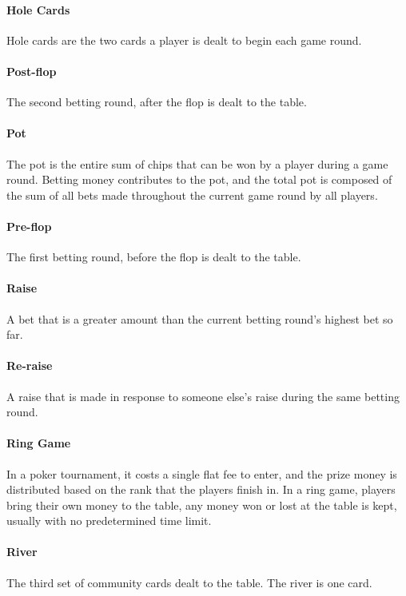 \begin{flushleft}
\paragraph*{Hole Cards} Hole cards are the two cards a player is dealt to begin each game round.
 
\paragraph*{Post-flop} The second betting round, after the flop is dealt to the table.

\paragraph*{Pot} The pot is the entire sum of chips that can be won by a player during a game round. Betting money contributes to the pot, and the total pot is composed of the sum of all bets made throughout the current game round by all players.
 
\paragraph*{Pre-flop} The first betting round, before the flop is dealt to the table.
 
\paragraph*{Raise} A bet that is a greater amount than the current betting round's highest bet so far.

\paragraph*{Re-raise} A raise that is made in response to someone else's raise during the same betting round.
 
\paragraph*{Ring Game} In a poker tournament, it costs a single flat fee to enter, and the prize money is distributed based on the rank that the players finish in. In a ring game, players bring their own money to the table, any money won or lost at the table is kept, usually with no predetermined time limit.
 
\paragraph*{River} The third set of community cards dealt to the table. The river is one card.


\end{flushleft}
